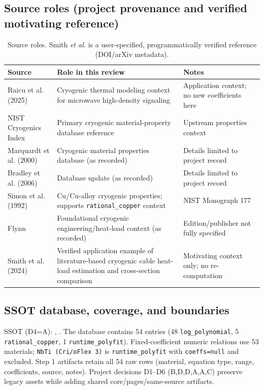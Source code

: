 \documentclass[11pt,a4paper]{article}
\begin{document}
\subsection{Source roles (project provenance and verified motivating reference)}
\begin{table}[h]
\centering
\small
\begin{tabular}{@{}p{4.1cm}p{6.9cm}p{3.8cm}@{}}
\toprule
Source & Role in this review & Notes \\
\midrule
Raicu et al. (2025) \cite{raicu2025} & Cryogenic thermal modeling context for microwave high-density signaling & Application context; no new coefficients here \\
NIST Cryogenics Index \cite{nist} & Primary cryogenic material-property database reference & Upstream properties context \\
Marquardt et al. (2000) \cite{marquardt} & Cryogenic material properties database (as recorded) & Details limited to project record \\
Bradley et al. (2006) \cite{bradley} & Database update (as recorded) & Details limited to project record \\
Simon et al. (1992) \cite{simon1992} & Cu/Cu-alloy cryogenic properties; supports \texttt{rational\_copper} context & NIST Monograph 177 \\
Flynn \cite{flynn} & Foundational cryogenic engineering/heat-load context (as recorded) & Edition/publisher not fully specified \\
Smith et al. (2024) \cite{smith2024} & Verified application example of literature-based cryogenic cable heat-load estimation and cross-section comparison & Motivating context only; no re-computation \\
\bottomrule
\end{tabular}
\caption{Source roles. Smith \textit{et al.} is a user-specified, programmatically verified reference (DOI/arXiv metadata).}
\end{table}

\subsection{SSOT database, coverage, and boundaries}
SSOT (D4=A): , . The database contains 54 entries (48 \texttt{log\_polynomial}, 5 \texttt{rational\_copper}, 1 \texttt{runtime\_polyfit}). Fixed-coefficient numeric relations use 53 materials; \texttt{NbTi (Cri/oFlex 3)} is \texttt{runtime\_polyfit} with \texttt{coeffs=null} and excluded. Step 1 artifacts retain all 54 raw rows (material, equation type, range, coefficients, source, notes). Project decisions D1--D6 (B,D,D,A,A,C) preserve legacy assets while adding shared core/pages/same-source artifacts.
\end{document}
